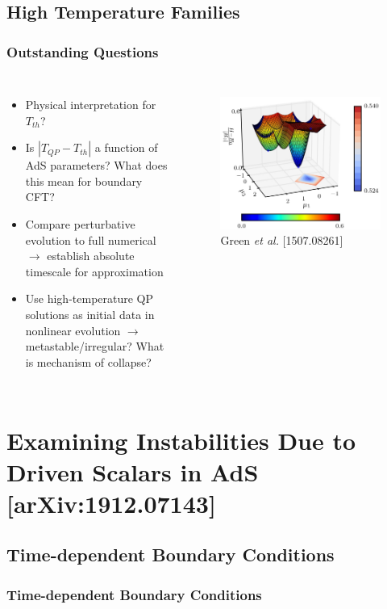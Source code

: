 \documentclass[mathserif,10pt]{beamer}
\newcommand{\bi}{\begin{itemize}}
\newcommand{\ei}{\end{itemize}}
\newcommand{\its}{\item}
\newcommand{\scr}{\scriptsize}
\begin{document}
\subsection{High Temperature Families}
\frame
{
  \frametitle{Outstanding Questions}
  \begin{columns}
    \bi
    \its Physical interpretation for $T_{th}$?
    \its Is $| T_{QP} - T_{th}|$ a function of AdS parameters? What does this mean for boundary CFT?
    \its Compare perturbative evolution to full numerical $\to$ establish absolute timescale for approximation
    \its Use high-temperature QP solutions as initial data in nonlinear evolution $\to$ metastable/irregular? What is mechanism of collapse?
    \ei
    \begin{figure}
      \centering
      \includegraphics[width=\textwidth]{Green_hamiltonian} \\ {\scr Green {\it et al.} [1507.08261]}
    \end{figure}
  \end{columns}
}


\section{Examining Instabilities Due to Driven Scalars in AdS [arXiv:1912.07143]}
\subsection{Time-dependent Boundary Conditions}
\frame
{
  \frametitle{Time-dependent Boundary Conditions}
}
\end{document}
